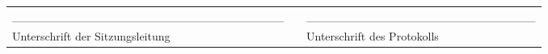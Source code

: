 \begin{tabular}{lll}
\________________________________&  &___________________________\\
Unterschrift der Sitzungsleitung &  &Unterschrift des Protokolls
\end{tabular}

